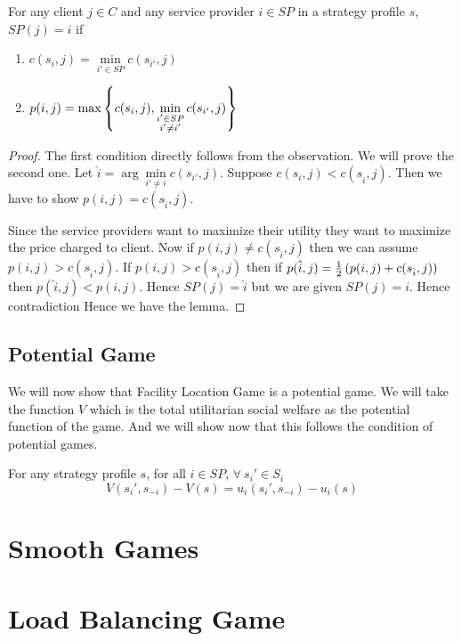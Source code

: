 \begin{lemma}{}{}
	For any client $j\in C$ and any service provider $i\in SP$ in a strategy profile $s$,  $SP(j)=i$ if\begin{enumerate}[label=(\roman*)]
		\item $c(s_i,j)=\min\limits_{i'\in SP}c(s_{i'},j)$
		\item $p(i,j)=\max\left\{c(s_i,j),\min\limits_{\substack{i'\in SP\\ i'\neq i'}}c(s_{i'},j)\right\}$
			\end{enumerate}
\end{lemma}
\begin{proof}
	The first condition directly follows from the observation.  We will prove the second one.   Let $\hat{i}=\arg\min\limits_{i'\neq i}c(s_{i'},j)$. Suppose $c(s_i,j)<c(s_{\hat{i}},j)$. Then we have to show $p(i,j)=c(s_{\hat{i}},j)$.  
	
	Since the service providers want to maximize their utility they want to maximize the price charged to client. Now if $p(i,j)\neq c(s_{\hat{i}},j)$ then we can assume $p(i,j)>c(s_{\hat{i}},j)$. If $p(i,j)>c(s_{\hat{i}},j)$ then if $p(\hat{i},j)=\frac12\left(p(i,j)+c(s_{\hat{i}},j)\right)$ then $p(\hat{i},j)<p(i,j)$. Hence $SP(j)=\hat{i}$ but we are given $SP(j)=i$. Hence contradiction \ctr Hence we have the lemma.
\end{proof}
\subsection{Potential Game}
We will now show that Facility Location Game is a potential game. We will take the function $V$ which is the total utilitarian social welfare as the potential function of the game. And we will show now that this follows the condition of potential games.
\begin{Theorem}{}{}
	For any strategy profile $s$, for all $i\in SP$, $\forall\ s_i'\in S_i$ $$V(s_i',s_{-i})-V(s)=u_i(s_i',s_{-i})-u_i(s)$$
\end{Theorem}


\section{Smooth Games}

\section{Load Balancing Game}